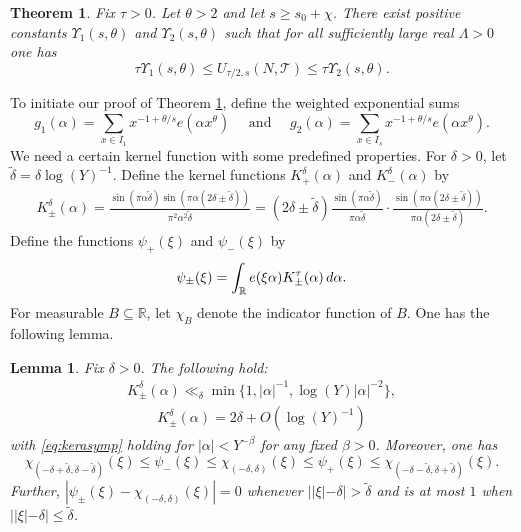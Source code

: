 \documentclass[10pt,a4paper]{amsart}
\numberwithin{equation}{section}
\newtheorem{lemma}{Lemma}[section]
\renewcommand{\d}{\,{\rm d}}
\newtheorem{theorem}{Theorem}[section]
\begin{document}
\begin{theorem} \label{thm:DH} 
Fix $\tau > 0$. Let $\theta > 2$ and let $s \geq s_0+\chi$. There exist positive constants $ \Upsilon_1(s,\theta) $ and $\Upsilon_2(s,\theta)$ such that for all sufficiently large real $\Lambda > 0$ one has 
\[ \tau\Upsilon_1(s,\theta) \leq U_{\tau/2,s}(N,\mathcal{T})\leq \tau\Upsilon_2(s,\theta). \]
\end{theorem}
To initiate our proof of Theorem \ref{thm:DH}, define the weighted exponential sums 
\[ g_1(\alpha) = \sum_{x \in I_1} x^{-1+\theta/s}e(\alpha x^{\theta}) \quad \text{ and } \quad g_2(\alpha) = \sum_{x \in I_s} x^{-1+\theta/s}e(\alpha x^{\theta}). \]
We need a certain kernel function with some predefined properties. For $\delta > 0$, let $\tilde{\delta} = \delta\log(Y)^{-1}$. Define the kernel functions $K^{\delta}_+(\alpha)$ and $K^{\delta}_-(\alpha)$ by 
\begin{align} \label{eq:kerform}
K^{\delta}_{\pm}(\alpha) = \frac{\sin(\pi\alpha\tilde{\delta})\sin(\pi\alpha(2\delta\pm\tilde{\delta}))}{\pi^2 \alpha^2 \tilde{\delta}} = (2\delta\pm\tilde{\delta})\frac{\sin(\pi \alpha \tilde{\delta})}{\pi\alpha\tilde{\delta}} \cdot \frac{\sin(\pi\alpha(2\delta\pm \tilde{\delta}))}{\pi \alpha (2\delta\pm\tilde{\delta})}.
\end{align} 
Define the functions $\psi_+(\xi)$ and $\psi_-(\xi)$ by 
\[ \psi_{\pm}(\xi) = \int_{\mathbb{R}} e(\xi\alpha)K^{\tau}_{\pm}(\alpha)\d\alpha. \]
For measurable $B \subseteq \mathbb{R}$, let $\chi_{B}$ denote the indicator function of $B$. One has the following lemma. 

\begin{lemma} \label{lem:kernel}
Fix $\delta > 0$. The following hold: 
\begin{align} \label{eq:kerbound}
K^{\delta}_{\pm}(\alpha) \ll_{\delta} \min\{1, |\alpha|^{-1},\log(Y)|\alpha|^{-2} \},
\end{align}
\begin{align} \label{eq:kerasymp}
K^{\delta}_{\pm}(\alpha) = 2\delta+O(\log(Y)^{-1}) 
\end{align}
with \eqref{eq:kerasymp} holding for $|\alpha| < Y^{-\beta}$ for any fixed $\beta > 0$. Moreover, one has
\[ \chi_{(-\delta+\tilde{\delta},\delta-\tilde{\delta})} (\xi) \leq \psi_-(\xi) \leq \chi_{(-\delta,\delta)}(\xi) \leq \psi_+(\xi) \leq \chi_{(-\delta-\tilde{\delta},\delta+\tilde{\delta})}(\xi). \]
Further, $|\psi_{\pm}(\xi)-\chi_{(-\delta,\delta)}(\xi)| = 0$ whenever $||\xi|-\delta|>\tilde{\delta}$ and is at most $1$ when $||\xi|-\delta|\leq \tilde{\delta}$. 
\end{lemma}
\end{document}
